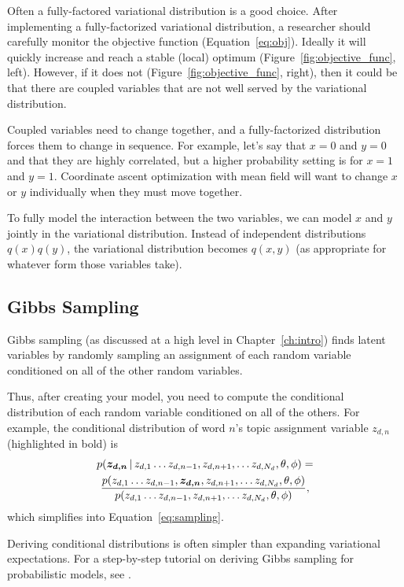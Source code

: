 Often a fully-factored variational distribution is a good choice.
After implementing a fully-factorized variational distribution, a
researcher should carefully monitor the objective function
(Equation~\ref{eq:obj}).  Ideally it will quickly increase and reach a
stable (local) optimum (Figure~\ref{fig:objective_func}, left).
However, if it does not (Figure~\ref{fig:objective_func}, right), then
it could be that there are coupled variables that are not well served
by the variational distribution.

Coupled variables need to change together, and a fully-factorized
distribution forces them to change in sequence.  For example, let's
say that $x=0$ and $y=0$ and that they are highly correlated, but a
higher probability setting is for $x=1$ and $y=1$.  Coordinate ascent
optimization with mean field will want to change $x$ or $y$
individually when they must move together.

To fully model the interaction between the two variables, we can model
$x$ and $y$ jointly in the variational distribution.  Instead of
independent distributions $q(x)q(y)$, the variational distribution
becomes $q(x,y)$ (as appropriate for whatever form those variables take).

\subsection{Gibbs Sampling}

Gibbs sampling (as discussed at a high level in Chapter~\ref{ch:intro}) finds
latent variables by randomly sampling an assignment of each random
variable conditioned on all of the other random variables.

Thus, after creating your model, you need to compute the conditional
distribution of each random variable conditioned on all of the
others.  For example, the conditional distribution of word $n$'s topic
assignment variable $z_{d,n}$ (highlighted in bold) is
\begin{multline}
p(\bm{z_{d,n}} \, | \, z_{d, 1} \dots z_{d, n-1}, z_{d, n+1}, \dots z_{d, N_d},
\theta, \phi) = \\
\frac{p(z_{d, 1} \dots z_{d, n-1}, \bm{z_{d, n}}, z_{d, n+1}, \dots z_{d, N_d}, \theta, \phi)}{ p(z_{d, 1} \dots z_{d, n-1}, z_{d, n+1}, \dots z_{d, N_d},
\theta, \phi)},
\label{eq:gibbs_conditional}
\end{multline}
which simplifies into Equation~\ref{eq:sampling}.

Deriving conditional distributions is often simpler than expanding
variational expectations.  For a step-by-step tutorial on deriving
Gibbs sampling for probabilistic models, see \citet{hardisty-10}.

